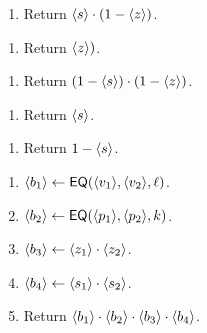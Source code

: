\begin{enumerate}
\item Return $\langle s \rangle \cdot (1-\langle z \rangle)$.
\end{enumerate}

\begin{enumerate}
\item Return $\langle z \rangle)$.
\end{enumerate}

\begin{enumerate}
\item Return $(1-\langle s \rangle) \cdot (1-\langle z \rangle)$.
\end{enumerate}

\begin{enumerate}
\item Return $\langle s \rangle$.
\end{enumerate}

\begin{enumerate}
\item Return $1-\langle s \rangle$.
\end{enumerate}

\begin{enumerate}
\item $\langle b_1 \rangle \leftarrow \mathsf{EQ}(\langle v_1 \rangle,\langle v_2 \rangle,\ell)$.
\item $\langle b_2 \rangle \leftarrow \mathsf{EQ}(\langle p_1 \rangle,\langle p_2 \rangle,k)$.
\item $\langle b_3 \rangle \leftarrow \langle z_1 \rangle \cdot \langle z_2 \rangle$.
\item $\langle b_4 \rangle \leftarrow \langle s_1 \rangle \cdot \langle s_2 \rangle$.
\item Return $\langle b_1 \rangle \cdot \langle b_2 \rangle \cdot \langle b_3 \rangle \cdot \langle b_4 \rangle$.
\end{enumerate}

